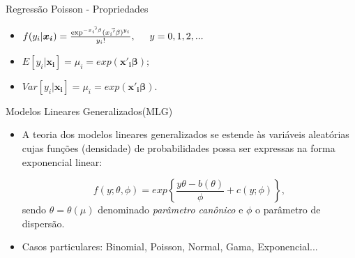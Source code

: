 \documentclass[10pt, aspectratio=169]{beamer}
\begin{document}



\begin{frame}{Regressão Poisson - Propriedades} 


\vspace{0,8cm}  
    
    \begin{itemize}
        
        \item $f(y_{i}|\boldsymbol{x_{i}})=\frac{\exp^{- \vec{{x_{i}}' \beta}}( \vec{{x_{i}}' \beta})^{y_{i}}}{y_{i}!},\hspace{5mm}y=0,1,2,...$

  
  \vspace{0,8cm}  

        
        \item $E\left [ y_{i}|\boldsymbol{x_{i}} \right ]= \mu_{i}=exp\left ( \boldsymbol{x'_{i}\beta} \right );$

\vspace{0,8cm}  
   
        \item $Var\left [ y_{i}|\mathbf{x_{i}} \right ]= \mu_{i}=exp\left ( \boldsymbol{x'_{i}\beta} \right ).$
    

    
    
\end{itemize}

\end{frame}






\begin{frame}{Modelos Lineares Generalizados(MLG)} 

\begin{itemize}

\item A teoria dos modelos lineares generalizados se estende às variáveis aleatórias cujas funções (densidade) de probabilidades possa ser expressas na forma exponencial linear:

  \vspace{0,5cm}  

$$
    f\left ( y;\theta,\phi \right) =exp\left \{ \frac{y\theta-b\left ( \theta \right )}{\phi}+c\left ( y;\phi \right ) \right \},
$$
  \vspace{0,5cm}  
sendo $\theta=\theta(\mu)$ denominado \textit{parâmetro canônico} e $\phi$ o parâmetro de dispersão.

  \vspace{0,5cm}  

\item Casos particulares: Binomial, Poisson, Normal, Gama, Exponencial...

\end{itemize}
\end{frame}
\end{document}

